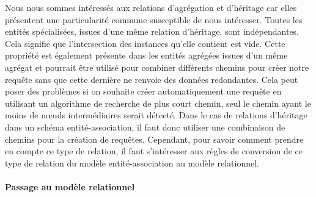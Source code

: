 Nous nous sommes intéressés aux relations d'agrégation et d'héritage car elles présentent une particularité commune susceptible de nous intéresser. Toutes les entités spécialisées, issues d'une même relation d'héritage, sont indépendantes. Cela signifie que l'intersection des instances qu'elle contient est vide. Cette propriété est également présente dans les entités agrégées issues d'un même agrégat et pourrait être utilisé pour combiner différents chemins pour créer notre requête sans que cette dernière ne renvoie des données redondantes.  Cela peut poser des problèmes si on souhaite créer automatiquement une requête en utilisant un algorithme de recherche de plus court chemin, seul le chemin ayant le moins de nœuds intermédiaires serait détecté.
Dans le cas de relations d'héritage dans un schéma entité-association, il faut donc utiliser une combinaison de chemins pour la création de requêtes. Cependant, pour savoir comment prendre en compte ce type de relation, il faut s'intéresser aux règles de conversion de ce type de relation du modèle entité-association au modèle relationnel.


\paragraph*{Passage au modèle relationnel}

